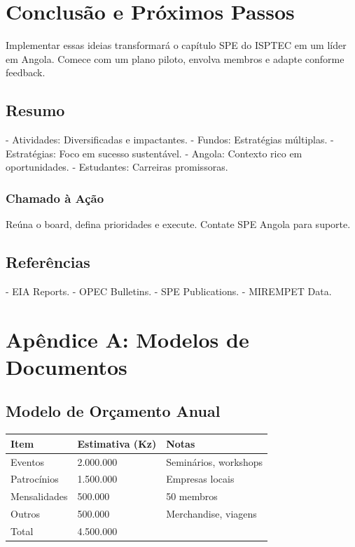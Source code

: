 \documentclass[12pt]{article}
\begin{document}
\newpage

\section{Conclusão e Próximos Passos}

Implementar essas ideias transformará o capítulo SPE do ISPTEC em um líder em Angola. Comece com um plano piloto, envolva membros e adapte conforme feedback.

\subsection{Resumo}
- Atividades: Diversificadas e impactantes.
- Fundos: Estratégias múltiplas.
- Estratégias: Foco em sucesso sustentável.
- Angola: Contexto rico em oportunidades.
- Estudantes: Carreiras promissoras.

\subsubsection{Chamado à Ação}
Reúna o board, defina prioridades e execute. Contate SPE Angola para suporte.

\subsection{Referências}
- EIA Reports.
- OPEC Bulletins.
- SPE Publications.
- MIREMPET Data.

\appendix

\section{Apêndice A: Modelos de Documentos}

\subsection{Modelo de Orçamento Anual}
\begin{longtable}{|l|l|l|}
\hline
Item & Estimativa (Kz) & Notas \\
\hline
Eventos & 2.000.000 & Seminários, workshops \\
Patrocínios & 1.500.000 & Empresas locais \\
Mensalidades & 500.000 & 50 membros \\
Outros & 500.000 & Merchandise, viagens \\
\hline
Total & 4.500.000 & \\
\hline
\end{longtable}
\end{document}
